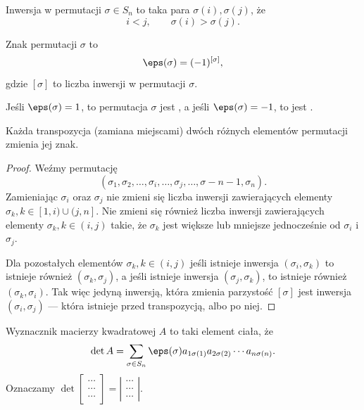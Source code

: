 \begin{definition}
    Inwersja w permutacji $\sigma \in S_n$ to taka para $\sigma(i), \sigma(j)$, że
    \[ i < j, \qquad \sigma(i) > \sigma(j). \]
\end{definition}

\begin{definition}
    Znak permutacji $\sigma$ to
    \[ \eps(\sigma) = (-1)^{[\sigma]}, \]
    gdzie $[\sigma]$ to liczba inwersji w permutacji $\sigma$.
\end{definition}

Jeśli $\eps(\sigma) = 1$, to permutacja $\sigma$ jest , a jeśli  $\eps(\sigma) = -1$, to jest .

\begin{fact}
    \label{f:sign of transposition}
    Każda transpozycja (zamiana miejscami) dwóch różnych elementów permutacji zmienia jej znak.
\end{fact}
\begin{proof}
    Weźmy permutację
    \[ (\sigma_1, \sigma_2, \ldots, \sigma_i, \ldots, \sigma_j, \ldots, \sigma-{n-1}, \sigma_n). \]
    Zamieniając $\sigma_i$ oraz $\sigma_j$ nie zmieni się liczba inwersji zawierających elementy $\sigma_k, k \in [1,i)\cup(j,n]$. Nie zmieni się również liczba inwersji zawierających elementy $\sigma_k, k \in (i,j)$ takie, że $\sigma_k$ jest większe lub mniejsze jednocześnie od $\sigma_i$ i $\sigma_j$.

    Dla pozostałych elementów $\sigma_k, k \in (i, j)$ jeśli istnieje inwersja $(\sigma_i, \sigma_k)$ to istnieje również $(\sigma_k, \sigma_j)$, a jeśli istnieje inwersja $(\sigma_j, \sigma_k)$, to istnieje również $(\sigma_k, \sigma_i)$. Tak więc jedyną inwersją, która zmienia parzystość $[\sigma]$ jest inwersja $(\sigma_i, \sigma_j)$ --- która istnieje przed transpozycją, albo po niej.
\end{proof}

\begin{definition}
    Wyznacznik macierzy kwadratowej $A$ to taki element ciała, że
    \[ \det A = \sum_{\sigma\in S_n} \eps(\sigma)a_{1\sigma(1)}a_{2\sigma(2)}\cdots a_{n\sigma(n)}. \]
    Oznaczamy $\det
    \left[\begin{smallmatrix}
        \cdots \\ \cdots \\ \cdots
    \end{smallmatrix}\right] =
    \left|\begin{smallmatrix}
        \cdots \\ \cdots \\ \cdots
    \end{smallmatrix}\right|$.
\end{definition}

